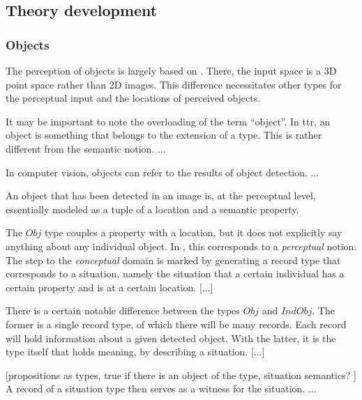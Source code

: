 \documentclass[11pt, a4paper]{article}
\begin{document}
\subsection{Theory development}
\label{ssec:theory}



\subsubsection{Objects}


The perception of objects is largely based on \cite{lspc}.
There, the input space is a 3D point space rather than 2D images.
This difference necessitates other types for the perceptual input and the locations of perceived objects.



It may be important to note the overloading of the term ``object''.
In \gls{ttr}, an object is something that belongs to the extension of a type.
This is rather different from the semantic notion.
...

In computer vision, objects can refer to the results of object detection.
...

An object that has been detected in an image is, at the perceptual level, essentially modeled as a tuple of a location and a semantic property.

The $Obj$ type couples a property with a location, but it does not explicitly say anything about any individual object.
In \cite{lspc}, this corresponds to a \textit{perceptual} notion.
The step to the \textit{conceptual} domain is marked by generating a record type that corresponds to a situation, namely the situation that a certain individual has a certain property and is at a certain location.
[...]

There is a certain notable difference between the types $Obj$ and $IndObj$.
The former is a single record type, of which there will be many records.
Each record will hold information about a given detected object.
With the latter, it is the type itself that holds meaning, by describing a situation.
[...]

[propositions as types, true if there is an object of the type, situation semantics? \cite{BarwiseSituationsAttitudes1981}]
A record of a situation type then serves as a witness for the situation.
...
\end{document}
